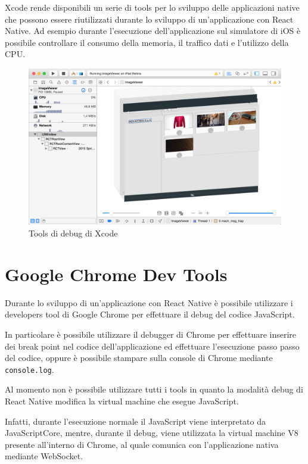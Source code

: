 Xcode rende disponibili un serie di tools per lo sviluppo delle applicazioni native che possono essere riutilizzati durante lo sviluppo di un'applicazione con React Native. Ad esempio durante l'esecuzione dell'applicazione sul simulatore di iOS è possibile controllare il consumo della memoria, il traffico dati e l'utilizzo della CPU.

\begin{figure}[htp]
\centering
\includegraphics[width=\textwidth]{../immagini/xcode-tools}
\caption{Tools di debug di Xcode}  
\end{figure}
\FloatBarrier

\section{Google Chrome Dev Tools}

Durante lo sviluppo di un'applicazione con React Native è possibile utilizzare i developers tool di Google Chrome per effettuare il debug del codice JavaScript.

In particolare è possibile utilizzare il debugger di Chrome per effettuare inserire dei break point nel codice dell'applicazione ed effettuare l'esecuzione passo passo del codice, oppure è possibile stampare sulla console di Chrome mediante \texttt{console.log}.

Al momento non è possibile utilizzare tutti i tools in quanto la modalità debug di React Native modifica la virtual machine che esegue JavaScript.

Infatti, durante l'esecuzione normale il JavaScript viene interpretato da JavaScriptCore, mentre, durante il debug, viene utilizzata la virtual machine V8 presente all'interno di Chrome, al quale comunica con l'applicazione nativa mediante WebSocket.

